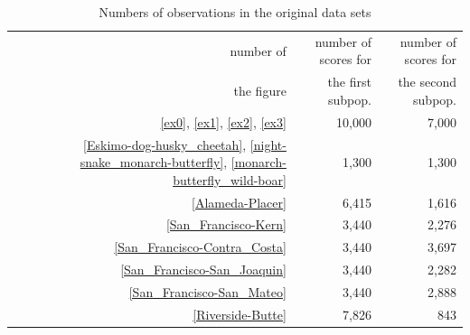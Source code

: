 \documentclass{article}
\begin{document}
\begin{table}
\caption{Numbers of observations in the original data sets}
\label{sizes}
\begin{center}
\begin{tabular}{rrr}
\hline
number of & number of scores for & number of scores for \\
the figure & the first subpop. & the second subpop. \\\hline
\ref{ex0}, \ref{ex1}, \ref{ex2}, \ref{ex3} & 10,000 & 7,000 \\
\ref{Eskimo-dog-husky_cheetah}, \ref{night-snake_monarch-butterfly},
\ref{monarch-butterfly_wild-boar} & 1,300 & 1,300 \\
\ref{Alameda-Placer} & 6,415 & 1,616 \\
\ref{San_Francisco-Kern} & 3,440 & 2,276 \\
\ref{San_Francisco-Contra_Costa} & 3,440 & 3,697 \\
\ref{San_Francisco-San_Joaquin} & 3,440 & 2,282 \\
\ref{San_Francisco-San_Mateo} & 3,440 & 2,888 \\
\ref{Riverside-Butte} & 7,826 & 843 \\
\hline
\end{tabular}
\end{center}
\end{table}
\end{document}

